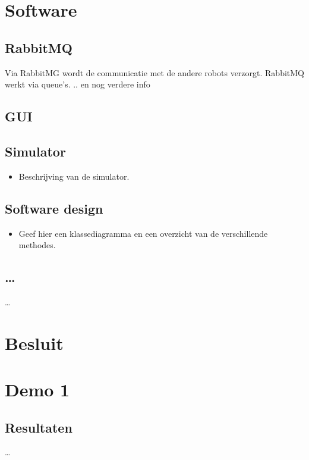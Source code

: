\documentclass[tt1]{penoverslag}
\begin{document}
\section{Software}
\label{secc:softw}

\subsection{RabbitMQ}
\label{secc:RabbMQ}
Via RabbitMG wordt de communicatie met de andere robots verzorgt. RabbitMQ werkt via queue's. .. en nog verdere info

\subsection{GUI}


\subsection{Simulator}
\begin{itemize}
\item Beschrijving van de simulator.
\end{itemize}

\subsection{Software design}
\begin{itemize}
\item Geef hier een klassediagramma en een overzicht van de verschillende methodes.
\end{itemize}

\subsection{\ldots}
\ldots


\section{Besluit}



\newpage
\makeappendix

\section{Demo 1}

\subsection{Resultaten}
\ldots
\end{document}
